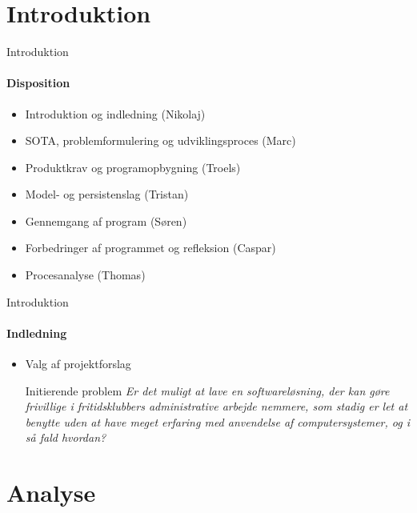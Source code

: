 \section{Introduktion}


\begin{frame}{Introduktion}
\framesubtitle{Disposition}

	\begin{itemize}
	\item Introduktion og indledning (Nikolaj)
	\item SOTA, problemformulering og udviklingsproces (Marc)
	\item Produktkrav og programopbygning (Troels)
	\item Model- og persistenslag (Tristan)
	\item Gennemgang af program (Søren)
	\item Forbedringer af programmet og refleksion (Caspar)
	\item Procesanalyse	(Thomas)
	\end{itemize}
\end{frame}


\begin{frame}{Introduktion}
\framesubtitle{Indledning}
	\begin{itemize}	
	\item Valg af projektforslag
	\newline
			
		\begin{beamerboxesrounded}[upper=headerCol,lower=bodyCol,shadow=true]{Initierende problem}
		\textit{Er det muligt at lave en softwareløsning, der kan gøre frivillige i fritidsklubbers administrative
		arbejde nemmere, som stadig er let at benytte uden at have meget erfaring med anvendelse af computersystemer, og i så fald hvordan?}
  		\end{beamerboxesrounded}
  		
	\end{itemize}
	
\end{frame}

\section{Analyse}
